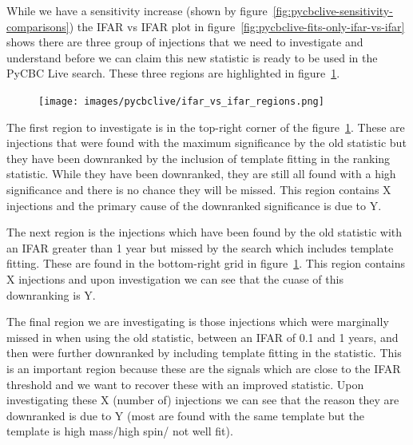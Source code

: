 While we have a sensitivity increase (shown by figure~\ref{fig:pycbclive-sensitivity-comparisons}) the IFAR vs IFAR plot in figure~\ref{fig:pycbclive-fits-only-ifar-vs-ifar} shows there are three group of injections that we need to investigate and understand before we can claim this new statistic is ready to be used in the PyCBC Live search. These three regions are highlighted in figure~\ref{fig:pycbclive-region-highlight}.
%
\begin{figure}
       \centering
    \texttt{[image: images/pycbclive/ifar\_vs\_ifar\_regions.png]}
    \caption{}
    \label{fig:pycbclive-region-highlight}
\end{figure}
%
The first region to investigate is in the top-right corner of the figure~\ref{fig:pycbclive-region-highlight}. These are injections that were found with the maximum significance by the old statistic but they have been downranked by the inclusion of template fitting in the ranking statistic. While they have been downranked, they are still all found with a high significance and there is no chance they will be missed. This region contains X injections and the primary cause of the downranked significance is due to Y.

The next region is the injections which have been found by the old statistic with an IFAR greater than 1 year but missed by the search which includes template fitting. These are found in the bottom-right grid in figure~\ref{fig:pycbclive-region-highlight}. This region contains X injections and upon investigation we can see that the cuase of this downranking is Y.

The final region we are investigating is those injections which were marginally missed in when using the old statistic, between an IFAR of 0.1 and 1 years, and then were further downranked by including template fitting in the statistic. This is an important region because these are the signals which are close to the IFAR threshold and we want to recover these with an improved statistic. Upon investigating these X (number of) injections we can see that the reason they are downranked is due to Y (most are found with the same template but the template is high mass/high spin/ not well fit).